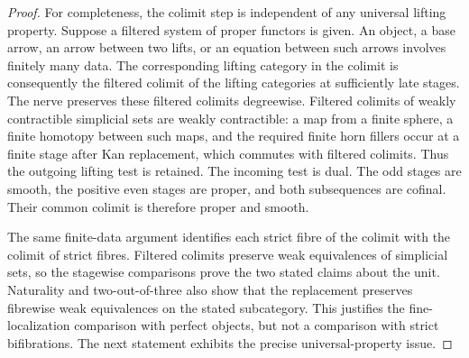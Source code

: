 \begin{proof}
For completeness, the colimit step is independent of any universal lifting property. Suppose a filtered system of proper functors is given. An object, a base arrow, an arrow between two lifts, or an equation between such arrows involves finitely many data. The corresponding lifting category in the colimit is consequently the filtered colimit of the lifting categories at sufficiently late stages. The nerve preserves these filtered colimits degreewise. Filtered colimits of weakly contractible simplicial sets are weakly contractible: a map from a finite sphere, a finite homotopy between such maps, and the required finite horn fillers occur at a finite stage after Kan replacement, which commutes with filtered colimits. Thus the outgoing lifting test is retained. The incoming test is dual. The odd stages are smooth, the positive even stages are proper, and both subsequences are cofinal. Their common colimit is therefore proper and smooth.

The same finite-data argument identifies each strict fibre of the colimit with the colimit of strict fibres. Filtered colimits preserve weak equivalences of simplicial sets, so the stagewise comparisons prove the two stated claims about the unit. Naturality and two-out-of-three also show that the replacement preserves fibrewise weak equivalences on the stated subcategory. This justifies the fine-localization comparison with perfect objects, but not a comparison with strict bifibrations. The next statement exhibits the precise universal-property issue.
\end{proof}

